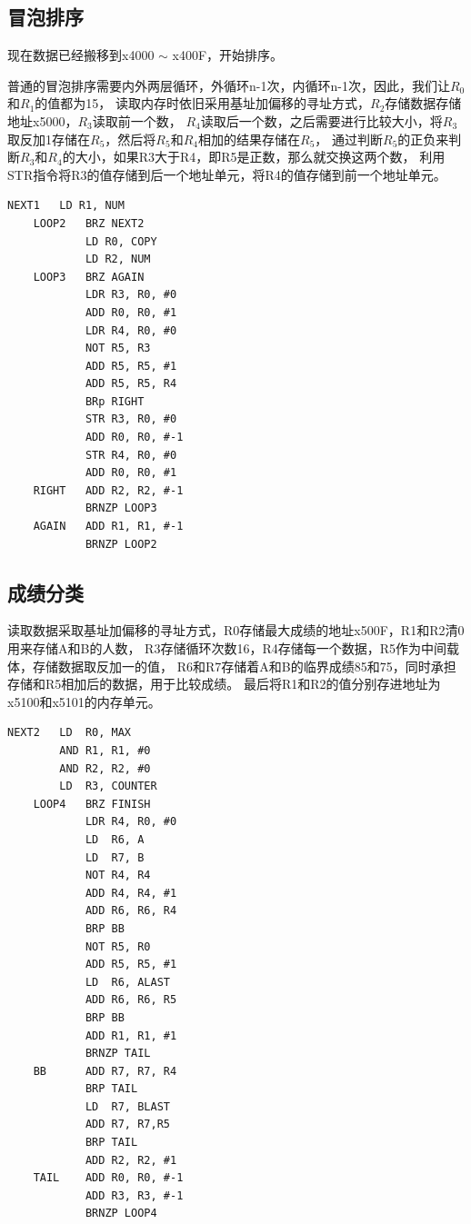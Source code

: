 \documentclass[UTF8]{ctexart}
\begin{document}
\subsection{冒泡排序}
现在数据已经搬移到x4000 $\sim$ x400F，开始排序。

普通的冒泡排序需要内外两层循环，外循环n-1次，内循环n-1次，因此，我们让$R_0$和$R_1$的值都为15，
读取内存时依旧采用基址加偏移的寻址方式，$R_2$存储数据存储地址x5000，$R_3$读取前一个数，
$R_4$读取后一个数，之后需要进行比较大小，将$R_3$取反加1存储在$R_5$，然后将$R_5$和$R_4$相加的结果存储在$R_5$，
通过判断$R_5$的正负来判断$R_3$和$R_4$的大小，如果R3大于R4，即R5是正数，那么就交换这两个数，
利用STR指令将R3的值存储到后一个地址单元，将R4的值存储到前一个地址单元。

\begin{lstlisting}[basicstyle=\ttfamily,language={[x86masm]Assembler}]
    NEXT1	LD R1, NUM
    LOOP2	BRZ NEXT2
            LD R0, COPY
            LD R2, NUM
    LOOP3	BRZ AGAIN
            LDR R3, R0, #0
            ADD R0, R0, #1
            LDR R4, R0, #0
            NOT R5, R3
            ADD R5, R5, #1
            ADD R5, R5, R4
            BRp RIGHT
            STR R3, R0, #0
            ADD R0, R0, #-1
            STR R4, R0, #0
            ADD R0, R0, #1
    RIGHT	ADD R2, R2, #-1
            BRNZP LOOP3
    AGAIN	ADD R1, R1, #-1
            BRNZP LOOP2
\end{lstlisting}

\subsection{成绩分类}  
读取数据采取基址加偏移的寻址方式，R0存储最大成绩的地址x500F，R1和R2清0用来存储A和B的人数，
R3存储循环次数16，R4存储每一个数据，R5作为中间载体，存储数据取反加一的值，
R6和R7存储着A和B的临界成绩85和75，同时承担存储和R5相加后的数据，用于比较成绩。
最后将R1和R2的值分别存进地址为x5100和x5101的内存单元。

\begin{lstlisting}[basicstyle=\ttfamily,language={[x86masm]Assembler}]
    NEXT2	LD  R0, MAX
    	AND R1, R1, #0
    	AND R2, R2, #0
    	LD  R3, COUNTER
    LOOP4	BRZ FINISH
            LDR R4, R0, #0
            LD  R6, A
            LD  R7, B
            NOT R4, R4
            ADD R4, R4, #1
            ADD R6, R6, R4
            BRP BB
            NOT R5, R0
            ADD R5, R5, #1
            LD  R6, ALAST
            ADD R6, R6, R5
            BRP BB
            ADD R1, R1, #1
            BRNZP TAIL
    BB	    ADD R7, R7, R4
            BRP TAIL
            LD  R7, BLAST
            ADD R7, R7,R5
            BRP TAIL
            ADD R2, R2, #1
    TAIL	ADD R0, R0, #-1
            ADD R3, R3, #-1
            BRNZP LOOP4
\end{lstlisting}
\end{document}
